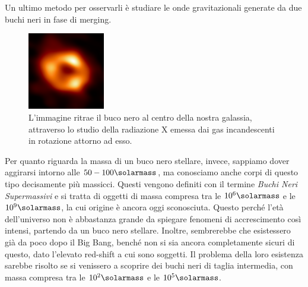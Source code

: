 Un ultimo metodo per osservarli è studiare le onde gravitazionali generate da due buchi neri in fase di merging.
\begin{figure}
    \centering
    \includegraphics[width=0.3\textwidth]{immagini/blackhole.png}
    \caption{L'immagine ritrae il buco nero al centro della nostra galassia, attraverso lo studio della radiazione X emessa dai gas incandescenti in rotazione attorno ad esso.}\label{fig:buco-nero}
\end{figure}

Per quanto riguarda la massa di un buco nero stellare, invece, sappiamo dover aggirarsi intorno alle $50 - 100\si{\solarmass}$, ma conosciamo anche corpi di questo tipo decisamente più massicci. Questi vengono definiti con il termine \emph{Buchi Neri Supermassivi} e si tratta di oggetti di massa compresa tra le $10^6 \si{\solarmass}$ e le $10^9 \si{\solarmass}$, la cui origine è ancora oggi sconosciuta. Questo perché l'età dell'universo non è abbastanza grande da spiegare fenomeni di accrescimento così intensi, partendo da un buco nero stellare. Inoltre, sembrerebbe che esistessero già da poco dopo il Big Bang, benché non si sia ancora completamente sicuri di questo, dato l'elevato red-shift a cui sono soggetti. Il problema della loro esistenza sarebbe risolto se si venissero a scoprire dei buchi neri di taglia intermedia, con massa compresa tra le $10^2 \si{\solarmass}$ e le $10^5 \si{\solarmass}$.